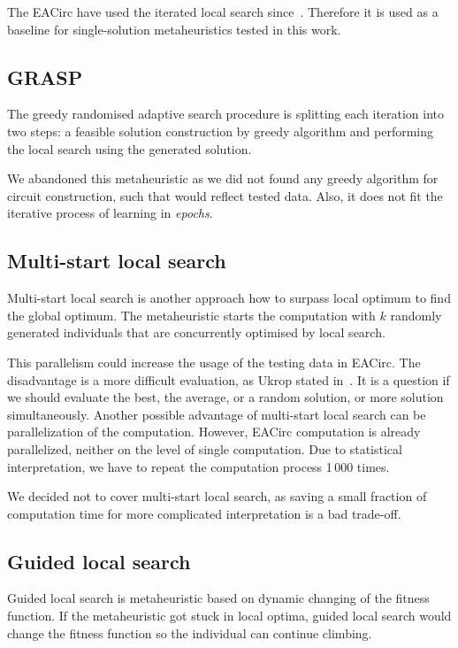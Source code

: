 \documentclass[
  print, %
  Table,   %
  nolof,     %
  nolot,     %
  11pt, %
  oneside  %
]{fithesis3}
\begin{document}
The EACirc have used the iterated local search since~\cite{sys2014constructing}. Therefore it is used as a baseline for single-solution metaheuristics tested in this work.

\subsection{GRASP}
\label{subsec:opt-single-sol-grasp}

The greedy randomised adaptive search procedure is splitting each iteration into two steps: a feasible solution construction by greedy algorithm and performing the local search using the generated solution.

We abandoned this metaheuristic as we did not found any greedy algorithm for circuit construction, such that would reflect tested data. Also, it does not fit the iterative process of learning in \textit{epochs}.

\subsection{Multi-start local search}
\label{subsec:opt-single-sol-msls}

Multi-start local search is another approach how to surpass local optimum to find the global optimum. The metaheuristic starts the computation with $k$ randomly generated individuals that are concurrently optimised by local search.

This parallelism could increase the usage of the testing data in EACirc. The disadvantage is a more difficult evaluation, as Ukrop stated in~\cite[Chapter~5]{ukropBcThesis}. It is a question if we should evaluate the best, the average, or a random solution, or more solution simultaneously. Another possible advantage of multi-start local search can be parallelization of the computation. However, EACirc computation is already parallelized, neither on the level of single computation. Due to statistical interpretation, we have to repeat the computation process 1\,000 times.

We decided not to cover multi-start local search, as saving a small fraction of computation time for more complicated interpretation is a bad trade-off.

\subsection{Guided local search}
\label{subsec:opt-single-sol-gls}

Guided local search is metaheuristic based on dynamic changing of the fitness function. If the metaheuristic got stuck in local optima, guided local search would change the fitness function so the individual can continue climbing.
\end{document}
